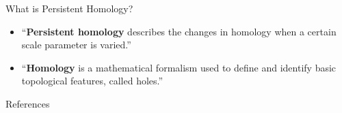 






\begin{frame}
    \titlepage
\end{frame}



\begin{frame}{What is Persistent Homology?}
	\begin{itemize}[<+->]
		\item ``\textbf{Persistent homology} describes the changes in homology when a certain scale parameter is varied.'' \cite{wagner}
		\item ``\textbf{Homology} is a mathematical formalism used to deﬁne and identify basic topological features, called holes.'' \cite{wagner}
	\end{itemize}
	\begin{figure}[]
		\centering
		\caption{\cite{dey}}
	\end{figure}
\end{frame}



\begin{frame}{References}
	
\end{frame}





